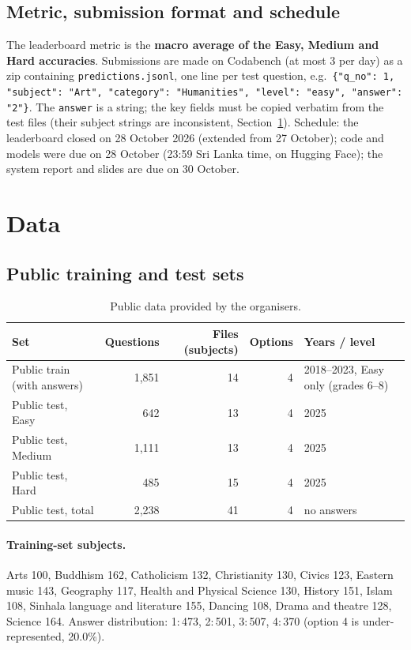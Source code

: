 \documentclass[10pt,a4paper]{article}
\begin{document}
\subsection{Metric, submission format and schedule}
The leaderboard metric is the \textbf{macro average of the Easy, Medium and Hard accuracies}. Submissions are made on
Codabench (at most 3 per day) as a zip containing \texttt{predictions.jsonl}, one line per test question, e.g.\
\verb|{"q_no": 1, "subject": "Art", "category": "Humanities", "level": "easy", "answer": "2"}|.
The \texttt{answer} is a string; the key fields must be copied verbatim from the test files (their subject strings
are inconsistent, Section~\ref{sec:data}). Schedule: the leaderboard closed on 28 October 2026 (extended from 27 October); code and
models were due on 28 October (23:59 Sri Lanka time, on Hugging Face); the system report and slides are due on
30 October.

\section{Data}\label{sec:data}
\subsection{Public training and test sets}
\begin{table}[h]
\centering\small
\begin{tabular}{lrrrl}
\toprule
Set & Questions & Files (subjects) & Options & Years / level\\
\midrule
Public train (with answers) & 1,851 & 14 & 4 & 2018--2023, Easy only (grades 6--8)\\
Public test, Easy & 642 & 13 & 4 & 2025\\
Public test, Medium & 1,111 & 13 & 4 & 2025\\
Public test, Hard & 485 & 15 & 4 & 2025\\
\midrule
Public test, total & 2,238 & 41 & 4 & no answers\\
\bottomrule
\end{tabular}
\caption{Public data provided by the organisers.}
\end{table}

\paragraph{Training-set subjects.} Arts 100, Buddhism 162, Catholicism 132, Christianity 130, Civics 123, Eastern music
143, Geography 117, Health and Physical Science 130, History 151, Islam 108, Sinhala language and literature 155,
Dancing 108, Drama and theatre 128, Science 164. Answer distribution: 1:\,473, 2:\,501, 3:\,507, 4:\,370 (option 4 is
under-represented, 20.0\%).
\end{document}

